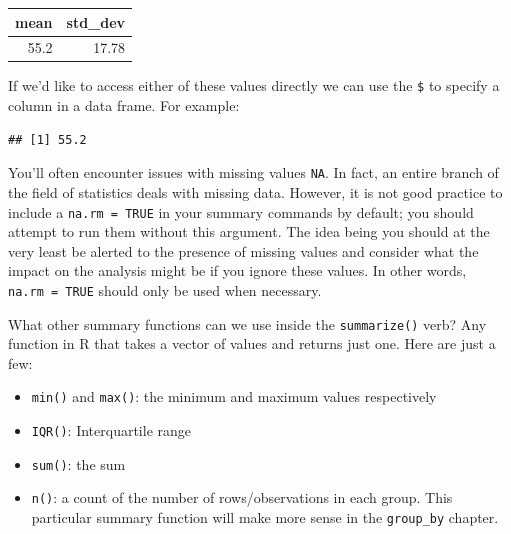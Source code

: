 \documentclass[]{tufte-book}
\newenvironment{Shaded}{\begin{snugshade}}{\end{snugshade}}
\newcommand{\KeywordTok}[1]{\textcolor[rgb]{0.13,0.29,0.53}{\textbf{{#1}}}}
\newcommand{\DataTypeTok}[1]{\textcolor[rgb]{0.13,0.29,0.53}{{#1}}}
\newcommand{\StringTok}[1]{\textcolor[rgb]{0.31,0.60,0.02}{{#1}}}
\newcommand{\OtherTok}[1]{\textcolor[rgb]{0.56,0.35,0.01}{{#1}}}
\newcommand{\NormalTok}[1]{{#1}}
\providecommand{\tightlist}{%
  \setlength{\itemsep}{0pt}\setlength{\parskip}{0pt}}
\begin{document}
\begin{Shaded}
\end{Shaded}

\begin{tabular}{r|r}
\hline
mean & std\_dev\\
\hline
55.2 & 17.78\\
\hline
\end{tabular}

If we'd like to access either of these values directly we can use the
\texttt{\$} to specify a column in a data frame. For example:

\begin{Shaded}
\end{Shaded}

\begin{verbatim}
## [1] 55.2
\end{verbatim}

You'll often encounter issues with missing values \texttt{NA}. In fact,
an entire branch of the field of statistics deals with missing data.
However, it is not good practice to include a \texttt{na.rm\ =\ TRUE} in
your summary commands by default; you should attempt to run them without
this argument. The idea being you should at the very least be alerted to
the presence of missing values and consider what the impact on the
analysis might be if you ignore these values. In other words,
\texttt{na.rm\ =\ TRUE} should only be used when necessary.

What other summary functions can we use inside the \texttt{summarize()}
verb? Any function in R that takes a vector of values and returns just
one. Here are just a few:

\begin{itemize}
\tightlist
\item
  \texttt{min()} and \texttt{max()}: the minimum and maximum values
  respectively
\item
  \texttt{IQR()}: Interquartile range
\item
  \texttt{sum()}: the sum
\item
  \texttt{n()}: a count of the number of rows/observations in each
  group. This particular summary function will make more sense in the
  \texttt{group\_by} chapter.
\end{itemize}
\end{document}
